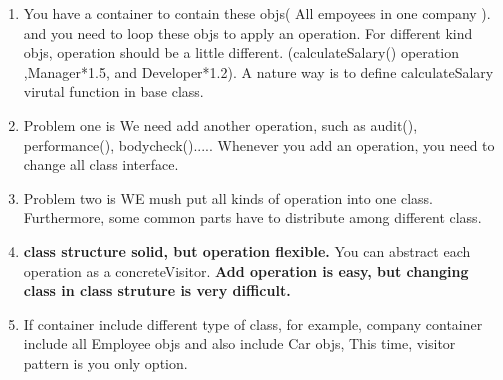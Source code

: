 \documentclass[a4paper,12pt,twoside]{book}
\begin{document}
\begin{itemize}
\begin{enumerate}
\item You have a container to contain these objs( All empoyees in one company ). and you need to loop these objs to apply an operation. For different kind objs, operation should be a little different. (calculateSalary() operation ,Manager*1.5, and Developer*1.2). A nature way is to define calculateSalary virutal function in base class. 

\item Problem one is We need add another operation, such as audit(), performance(), bodycheck()..... Whenever you add an operation, you need to change all class interface. 

\item Problem two is WE mush put all kinds of operation into one class.  Furthermore, some common parts  have to distribute among different class. 

\item \textbf{class structure solid, but operation flexible. } You can abstract each operation as a concreteVisitor.  \textbf{Add operation is easy, but changing  class in class struture is very difficult. }

\item If container include different type of class, for example, company container include all Employee objs and also include Car objs, This time, visitor pattern is you only option.  


\end{enumerate}

\end{itemize}
\end{document}
